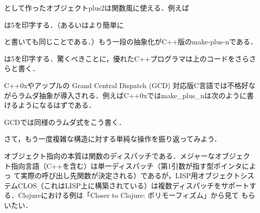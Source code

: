 \documentclass[a5paper,twoside,fleqn,draft]{jsbook}
\begin{document}

として作ったオブジェクトplus2は関数風に使える．例えば


は5を印字する．（あるいはより簡単に


と書いても同じことである．）もう一段の抽象化がC++版のmake-plus-nである．


は5を印字する．驚くべきことに，優れたC++プログラマは上のコードをさらさ
らと書く．

C++0xやアップルの Grand Central Dispatch (GCD) 対応版C言語では不格好な
がらラムダ抽象が導入される．例えばC++0xではmake\_plus\_nは次のように書
けるようになるはずである．


GCDでは同様のラムダ式をこう書く．


さて，もう一度複雑な構造に対する単純な操作を振り返ってみよう．

オブジェクト指向の本質は関数のディスパッチである．メジャーなオブジェク
ト指向言語（C++を含む）は単一ディスパッチ（第1引数が指す型ポインタによっ
て実際の呼び出し先関数が決定される）であるが，LISP用オブジェクトシス
テムCLOS（これはLISP上に構築されている）は複数ディスパッチをサポートす
る．Clojureにおける例は「Closer to Clojure: ポリモーフィズム」から見て
もらいたい．
\end{document}
